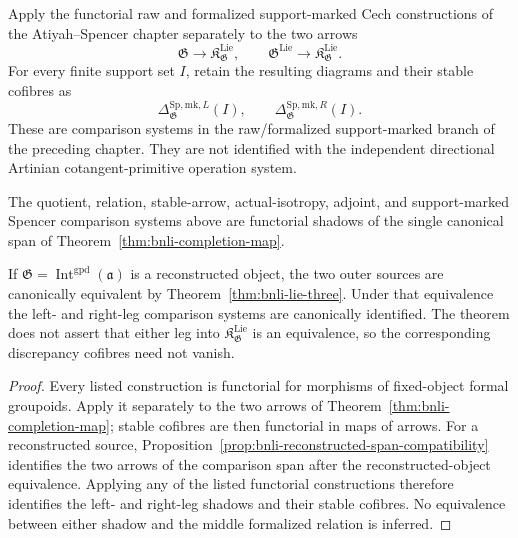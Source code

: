 \begin{definition}
\label{def:bnli-support-marked-discrepancy}
Apply the functorial raw and formalized support-marked Cech constructions of
the Atiyah--Spencer chapter separately to the two arrows
\[
    \mathfrak G\longrightarrow\mathfrak K_{\mathfrak G}^{\mathrm{Lie}},
    \qquad
    \mathfrak G^{\mathrm{Lie}}\longrightarrow
    \mathfrak K_{\mathfrak G}^{\mathrm{Lie}}.
\]
For every finite support set $I$, retain the resulting diagrams and their
stable cofibres as
\[
    \Delta^{\mathrm{Sp,mk},L}_{\mathfrak G}(I),
    \qquad
    \Delta^{\mathrm{Sp,mk},R}_{\mathfrak G}(I).
\]
These are comparison systems in the raw/formalized support-marked branch of
the preceding chapter.  They are not identified with the independent
directional Artinian cotangent-primitive operation system.
\end{definition}

\begin{theorem}
\label{thm:bnli-discrepancy-compatibility}
The quotient, relation, stable-arrow, actual-isotropy, adjoint, and
support-marked Spencer comparison systems above are functorial shadows of the
single canonical span of Theorem~\ref{thm:bnli-completion-map}.

If \(\mathfrak G=\operatorname{Int}^{\mathrm{gpd}}(\mathfrak a)\) is a reconstructed object, the two outer sources are canonically equivalent by Theorem~\ref{thm:bnli-lie-three}.  Under that equivalence the left- and right-leg comparison systems are canonically identified.  The theorem does not assert that either leg into \(\mathfrak K_{\mathfrak G}^{\mathrm{Lie}}\) is an equivalence, so the corresponding discrepancy cofibres need not vanish.
\end{theorem}

\begin{proof}
Every listed construction is functorial for morphisms of fixed-object formal
groupoids.  Apply it separately to the two arrows of
Theorem~\ref{thm:bnli-completion-map}; stable cofibres are then functorial in
maps of arrows.  For a reconstructed source,
Proposition~\ref{prop:bnli-reconstructed-span-compatibility} identifies the
two arrows of the comparison span after the reconstructed-object equivalence.
Applying any of the listed functorial constructions therefore identifies the
left- and right-leg shadows and their stable cofibres.  No equivalence between
either shadow and the middle formalized relation is inferred.
\end{proof}

